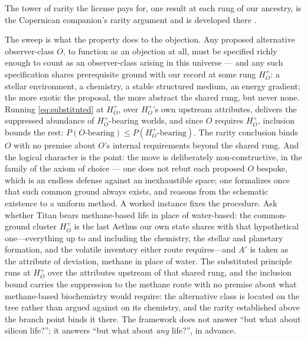 \documentclass[11pt]{article}
\theoremstyle{definition}
\begin{document}
The tower of rarity the license pays for, one result at each rung of our ancestry, is the Copernican companion's rarity argument and is developed there \cite{Nexus}.



The sweep is what the property does to the objection. Any proposed alternative observer-class $O$, to function as an objection at all, must be specified richly enough to count as an observer-class arising in this universe --- and any such specification shares prerequisite ground with our record at some rung $H^{+}_{O}$: a stellar environment, a chemistry, a stable structured medium, an energy gradient; the more exotic the proposal, the more abstract the shared rung, but never none. Running \eqref{eq:substituted} at $H^{+}_{O}$, over $H^{+}_{O}$'s own upstream attributes, delivers the suppressed abundance of $H^{+}_{O}$-bearing worlds, and since $O$ requires $H^{+}_{O}$, inclusion bounds the rest: $P(O\text{-bearing}) \le P(H^{+}_{O}\text{-bearing})$. The rarity conclusion binds $O$ with no premise about $O$'s internal requirements beyond the shared rung. And the logical character is the point: the move is deliberately non-constructive, in the family of the axiom of choice --- one does not rebut each proposed $O$ bespoke, which is an endless defense against an inexhaustible space; one formalizes once that such common ground always exists, and reasons from the schematic existence to a uniform method. A worked instance fixes the procedure. Ask whether Titan bears methane-based life in place of water-based: the common-ground cluster $H^{+}_{O}$ is the last Aethus our own state shares with that hypothetical one---everything up to and including the chemistry, the stellar and planetary formation, and the volatile inventory either route requires---and $A'$ is taken as the attribute of deviation, methane in place of water. The substituted principle runs at $H^{+}_{O}$ over the attributes upstream of that shared rung, and the inclusion bound carries the suppression to the methane route with no premise about what methane-based biochemistry would require: the alternative class is located on the tree rather than argued against on its chemistry, and the rarity established above the branch point binds it there. The framework does not answer ``but what about silicon life?''; it answers ``but what about \emph{any} life?'', in advance.
\end{document}
